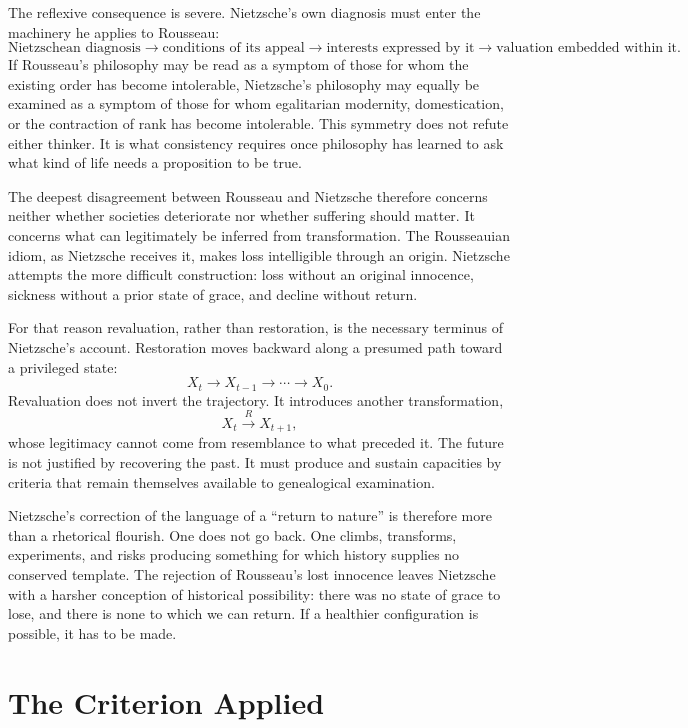 \documentclass[11pt]{article}
\theoremstyle{definition}
\begin{document}
The reflexive consequence is severe. Nietzsche's own diagnosis must enter the machinery he applies to Rousseau:
\[
\text{Nietzschean diagnosis}
\rightarrow
\text{conditions of its appeal}
\rightarrow
\text{interests expressed by it}
\rightarrow
\text{valuation embedded within it}.
\]
If Rousseau's philosophy may be read as a symptom of those for whom the existing order has become intolerable, Nietzsche's philosophy may equally be examined as a symptom of those for whom egalitarian modernity, domestication, or the contraction of rank has become intolerable. This symmetry does not refute either thinker. It is what consistency requires once philosophy has learned to ask what kind of life needs a proposition to be true.

The deepest disagreement between Rousseau and Nietzsche therefore concerns neither whether societies deteriorate nor whether suffering should matter. It concerns what can legitimately be inferred from transformation. The Rousseauian idiom, as Nietzsche receives it, makes loss intelligible through an origin. Nietzsche attempts the more difficult construction: loss without an original innocence, sickness without a prior state of grace, and decline without return.

For that reason revaluation, rather than restoration, is the necessary terminus of Nietzsche's account. Restoration moves backward along a presumed path toward a privileged state:
\[
X_t \rightarrow X_{t-1} \rightarrow \cdots \rightarrow X_0.
\]
Revaluation does not invert the trajectory. It introduces another transformation,
\[
X_t \xrightarrow{\ R\ } X_{t+1},
\]
whose legitimacy cannot come from resemblance to what preceded it. The future is not justified by recovering the past. It must produce and sustain capacities by criteria that remain themselves available to genealogical examination.

Nietzsche's correction of the language of a ``return to nature'' is therefore more than a rhetorical flourish. One does not go back. One climbs, transforms, experiments, and risks producing something for which history supplies no conserved template. The rejection of Rousseau's lost innocence leaves Nietzsche with a harsher conception of historical possibility: there was no state of grace to lose, and there is none to which we can return. If a healthier configuration is possible, it has to be made.

\appendix
\section{The Criterion Applied}
\end{document}
